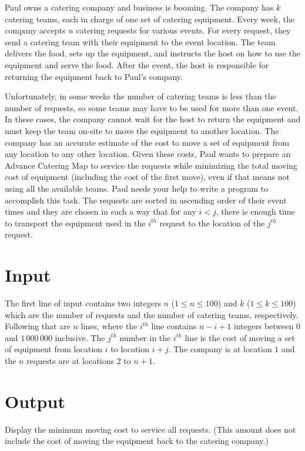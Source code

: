 \newcommand{\maxrequests}{100}
\newcommand{\maxteams}{100}
\newcommand{\maxcost}{1\,000\,000}


%
Paul owns a catering company and business is booming. The company has $k$ catering teams, each in charge of one set of catering equipment. Every week, the company accepts $n$ catering requests for various events. For every request, they send a catering team with their equipment to the event location. The team delivers the food, sets up the equipment, and instructs the host on how to use the equipment and serve the food. After the event, the host is responsible for returning the equipment back to Paul's company.

Unfortunately, in some weeks the number of catering teams is less than the number of requests, so some teams may have to be used for more than one event. In these cases, the company cannot wait for the host to return the equipment and must keep the team on-site to move the equipment to another location. The company has an accurate estimate of the cost to move a set of equipment from any location to any other location. Given these costs, Paul wants to prepare an Advance Catering Map to service the requests while minimizing the total moving cost of equipment (including the cost of the first move), even if that means not using all the available teams.
Paul needs your help to write a program to accomplish this task. The requests are sorted in ascending order of their event times and they are chosen in such a way that for any $i < j$, there is enough time to transport the equipment used in the $i^{th}$ request to the location of the $j^{th}$ request.   


\section*{Input}
The first line of input contains two integers $n$ ($1 \le n \le \maxrequests$) and $k$ ($1 \le k \le \maxteams$) which are the number of requests and the number of catering teams, respectively. Following that are $n$ lines, where the $i^{th}$ line contains $n-i+1$ integers between $0$ and $\maxcost$ inclusive. The $j^{th}$ number in the $i^{th}$ line is the cost of moving a set of equipment from location $i$ to location $i+j$. The company is at location $1$ and the $n$ requests are at locations $2$ to $n+1$.
 
\section*{Output}
Display the minimum moving cost to service all requests. (This amount does not include the cost of moving the equipment back to the catering company.)
